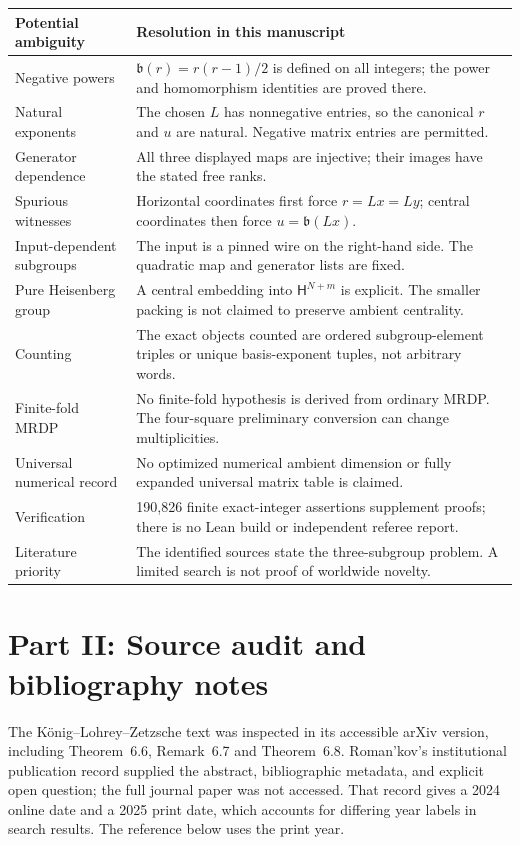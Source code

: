 \documentclass[11pt,letterpaper]{article}
\theoremstyle{definition}
\theoremstyle{remark}
\newcommand{\HH}{\mathsf H}
\newcommand{\bn}{\mathfrak b}
\begin{document}
\begin{longtable}{@{}p{}p{}@{}}
\toprule
Potential ambiguity & Resolution in this manuscript\\
\midrule
\endhead
Negative powers & $\bn(r)=r(r-1)/2$ is defined on all integers; the power and
homomorphism identities are proved there.\\[.5em]
Natural exponents & The chosen $L$ has nonnegative entries, so the canonical
$r$ and $u$ are natural. Negative matrix entries are permitted.\\[.5em]
Generator dependence & All three displayed maps are injective; their images
have the stated free ranks.\\[.5em]
Spurious witnesses & Horizontal coordinates first force $r=Lx=Ly$; central
coordinates then force $u=\bn(Lx)$.\\[.5em]
Input-dependent subgroups & The input is a pinned wire on the right-hand
side. The quadratic map and generator lists are fixed.\\[.5em]
Pure Heisenberg group & A central embedding into $\HH^{N+m}$ is explicit.
The smaller packing is not claimed to preserve ambient centrality.\\[.5em]
Counting & The exact objects counted are ordered subgroup-element triples
or unique basis-exponent tuples, not arbitrary words.\\[.5em]
Finite-fold MRDP & No finite-fold hypothesis is derived from ordinary MRDP.
The four-square preliminary conversion can change multiplicities.\\[.5em]
Universal numerical record & No optimized numerical ambient dimension or
fully expanded universal matrix table is claimed.\\[.5em]
Verification & 190,826 finite exact-integer assertions supplement proofs;
there is no Lean build or independent referee report.\\[.5em]
Literature priority & The identified sources state the three-subgroup
problem. A limited search is not proof of worldwide novelty.\\
\bottomrule
\end{longtable}

\section{Part II: Source audit and bibliography notes}\label{gts:tp:app:sources}
The K\"onig--Lohrey--Zetzsche text was inspected in its accessible arXiv
version, including Theorem~6.6, Remark~6.7 and Theorem~6.8. Roman'kov's
institutional publication record supplied the abstract, bibliographic
metadata, and explicit open question; the full journal paper was not
accessed. That record gives a 2024 online date and a 2025 print date, which
accounts for differing year labels in search results. The reference below
uses the print year.
\end{document}
